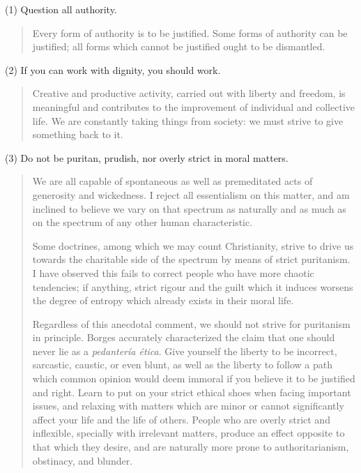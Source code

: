 \documentclass[a4paper, 12pt]{article}
\begin{document}
\normalsize
(1) Question all authority.

\small
\begin{quote}
    Every form of authority is to be justified. Some forms of authority can be 
    justified; all forms which cannot be justified ought to be dismantled. 
\end{quote}

\normalsize
(2) If you can work with dignity, you should work.

\small
\begin{quote}
    Creative and productive activity, carried out with liberty and freedom, is
    meaningful and contributes to the improvement of individual and collective
    life. We are constantly taking things from society: we must strive to give 
    something back to it. 
\end{quote}

\normalsize
(3) Do not be puritan, prudish, nor overly strict in moral matters.


\small
\begin{quote}

We are all capable of spontaneous as well as premeditated acts of generosity
and wickedness. I reject all essentialism on this matter, and am inclined to
believe we vary on that spectrum as naturally and as much as on the spectrum of any
other human characteristic.

Some doctrines, among which we may count Christianity, strive to drive us towards the 
charitable side of the spectrum by means of strict puritanism. I have observed this fails
to correct people who have more chaotic tendencies; if anything, strict rigour
and the guilt which it induces worsens the degree of entropy which already
exists in their moral life.  

Regardless of this anecdotal comment, we should not strive for puritanism in
principle. Borges accurately characterized the claim that one should never lie
as a \textit{pedantería ética}. Give yourself the liberty to be incorrect,
sarcastic, caustic, or even blunt, as well as the liberty to follow a path
which common opinion would deem immoral if you believe it to be justified and
right. Learn to put on your strict ethical shoes when facing important issues,
and relaxing with matters which are minor or cannot significantly affect your
life and the life of others. People who are overly strict and inflexible,
specially with irrelevant matters, produce an effect opposite to that which
they desire, and are naturally more prone to authoritarianism, obstinacy, and
blunder.

\end{quote}
\normalsize
\end{document}

